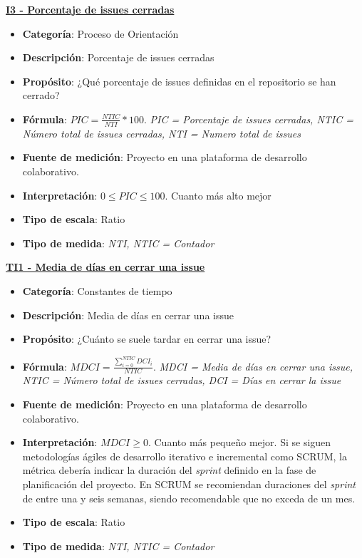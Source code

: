 \textbf{\underline{I3 - Porcentaje de issues cerradas}}

\begin{itemize}
	\tightlist
	\item \textbf{Categoría}: Proceso de Orientación
	\item \textbf{Descripción}: Porcentaje de issues cerradas
	\item \textbf{Propósito}: ¿Qué porcentaje de issues definidas en el repositorio se han cerrado?
	\item \textbf{Fórmula}: $PIC = \frac{NTIC}{NTI}*100$. \textit{PIC = Porcentaje de issues cerradas, NTIC = Número total de issues cerradas, NTI = Numero total de issues}
	\item \textbf{Fuente de medición}: Proyecto en una plataforma de desarrollo colaborativo.
	\item \textbf{Interpretación}: $0 \leq PIC \leq 100$. Cuanto más alto mejor
	\item \textbf{Tipo de escala}: Ratio
	\item \textbf{Tipo de medida}: \textit{NTI, NTIC = Contador}
\end{itemize}

\textbf{\underline{TI1 - Media de días en cerrar una issue}}

\begin{itemize}
	\tightlist
	\item \textbf{Categoría}: Constantes de tiempo
	\item \textbf{Descripción}:  Media de días en cerrar una issue
	\item \textbf{Propósito}: ¿Cuánto se suele tardar en cerrar una issue? 
	\item \textbf{Fórmula}: $MDCI = \frac{\sum_{i=0}^{NTIC}DCI_i}{NTIC}$. \textit{MDCI = Media de días en cerrar una issue, NTIC = Número total de issues cerradas, DCI = Días en cerrar la issue}
	\item \textbf{Fuente de medición}: Proyecto en una plataforma de desarrollo colaborativo.
	\item \textbf{Interpretación}: $MDCI \geq 0$. Cuanto más pequeño mejor. Si se siguen metodologías ágiles de desarrollo iterativo e incremental como SCRUM, la métrica debería indicar la duración del \textit{sprint} definido en la fase de planificación del proyecto. En SCRUM se recomiendan duraciones del \textit{sprint} de entre una y seis semanas, siendo recomendable que no exceda de un mes\cite{noauthor_scrum_2019}.
	\item \textbf{Tipo de escala}: Ratio
	\item \textbf{Tipo de medida}: \textit{NTI, NTIC = Contador}
\end{itemize}

